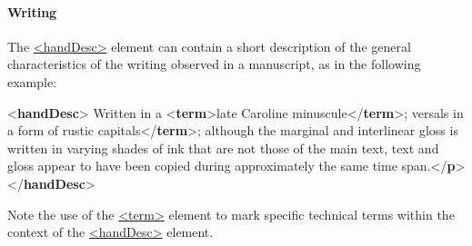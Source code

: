 \paragraph[{Writing}]{Writing}\label{msphwr}\par
The \hyperref[TEI.handDesc]{<handDesc>} element can contain a short description of the general characteristics of the writing observed in a manuscript, as in the following example: \par\bgroup{}\exampleFont \begin{shaded}\noindent\mbox{}{<\textbf{handDesc}>}\mbox{}\newline 
{}Written in a {<\textbf{term}>}late Caroline minuscule{</\textbf{term}>}; versals in a form of\mbox{}\newline 
{}rustic capitals{</\textbf{term}>}; although the marginal and interlinear gloss is\mbox{}\newline 
\hspace*{1em}\hspace*{1em} written in varying shades of ink that are not those of the main text, text and\mbox{}\newline 
\hspace*{1em}\hspace*{1em} gloss appear to have been copied during approximately the same time span.{</\textbf{p}>}\mbox{}\newline 
{</\textbf{handDesc}>}\end{shaded}\egroup\par \par
Note the use of the \hyperref[TEI.term]{<term>} element to mark specific technical terms within the context of the \hyperref[TEI.handDesc]{<handDesc>} element.\par
